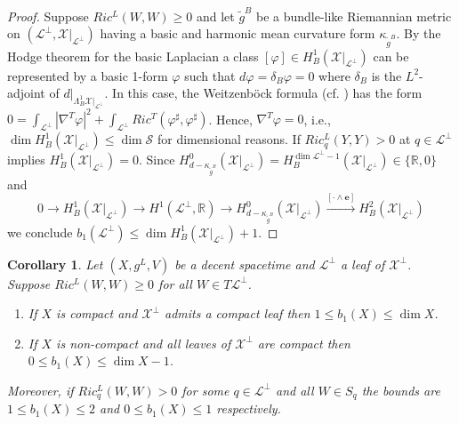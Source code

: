 \documentclass[a4paper,10pt,twoside]{amsart}
\newtheorem{corollary}[theorem]{Corollary}
\theoremstyle{definition}
\theoremstyle{remark}
\numberwithin{equation}{section}
\begin{document}
\begin{proof}
	Suppose $Ric^{L}(W,W) \geq 0$ and let $\tilde{g}^{B}$ be a bundle-like Riemannian metric
	on $(\mathcal{L}^{\perp},\mathcal{X}|_{\mathcal{L}^{\perp}})$ having a basic and harmonic mean curvature form $\kappa_{\tilde{g}^{B}}$.
	By the Hodge theorem for the basic Laplacian \cite{MR1146730} a class $[\varphi] \in H^{1}_{B}(\mathcal{X}|_{\mathcal{L}^{\perp}})$ can
	be represented by a basic 1-form $\varphi$ such that $d\varphi=\delta_{B}\varphi=0$ where $\delta_{B}$ is the $L^{2}$-adjoint of
	$d|_{\Lambda^{1}_{B}\mathcal{X}|_{\mathcal{L}^{\perp}}}$. In this case, the Weitzenb\"{o}ck formula (cf. \cite[Thm. 6.16]{habib-richardson-2010})
	has the form $0 = \int_{\mathcal{L}^{\perp}}{|\nabla^{T}\varphi|^{2}} + \int_{\mathcal{L}^{\perp}}{Ric^{T}(\varphi^{\sharp},\varphi^{\sharp})}$.
	Hence, $\nabla^{T}\varphi =0$, i.e., $\dim H^{1}_{B}(\mathcal{X}|_{\mathcal{L}^{\perp}}) \leq \dim \mathcal{S}$ for dimensional reasons.
	If $Ric^{L}_{q}(Y,Y) > 0$ at $q \in \mathcal{L}^{\perp}$ \cite[Cor. 6.17]{habib-richardson-2010} implies
	$H^{1}_{B}(\mathcal{X}|_{\mathcal{L}^{\perp}})=0$. Since
	$H^{0}_{d-\kappa_{\tilde{g}^{B}}}(\mathcal{X}|_{\mathcal{L}^{\perp}}) = H^{\dim \mathcal{L}^{\perp}-1}_{B}(\mathcal{X}|_{\mathcal{L}^{\perp}})
										\in \{{\mathbb{R}},0\}$ and
	\begin{equation*}
			0 \rightarrow H^{1}_{B}(\mathcal{X}|_{\mathcal{L}^{\perp}}) \rightarrow H^{1}(\mathcal{L}^{\perp},{\mathbb{R}}) \rightarrow
			H^{0}_{d-\kappa_{\tilde{g}^{B}}}(\mathcal{X}|_{\mathcal{L}^{\perp}}) \stackrel{[\cdot \wedge \mathbf{e}]}{\rightarrow}
				H^{2}_{B}(\mathcal{X}|_{\mathcal{L}^{\perp}})
	\end{equation*}
	we conclude $b_{1}(\mathcal{L}^{\perp}) \leq \dim H^{1}_{B}(\mathcal{X}|_{\mathcal{L}^{\perp}}) +1$.
\end{proof}
\begin{corollary}\label{bounds-for-cohom}
	Let $(X,g^{L},V)$ be a decent spacetime and $\mathcal{L}^{\perp}$ a leaf of $\mathcal{X}^{\perp}$. Suppose $Ric^{L}(W,W) \geq 0$ for
	all $W \in T\mathcal{L}^{\perp}$.
	\begin{enumerate}
		\item
		If $X$ is compact and $\mathcal{X}^{\perp}$ admits a compact leaf then $1 \leq b_{1}(X) \leq \dim X$.
		\item
		If $X$ is non-compact and all leaves of $\mathcal{X}^{\perp}$ are compact then $0 \leq b_{1}(X) \leq \dim X -1$.
	\end{enumerate}
	Moreover, if $Ric^{L}_{q}(W,W) > 0$ for some $q \in \mathcal{L}^{\perp}$ and all $W \in S_{q}$ the bounds are
	$1 \leq b_{1}(X) \leq 2$ and $0 \leq b_{1}(X) \leq 1$ respectively.
\end{corollary}
\end{document}
